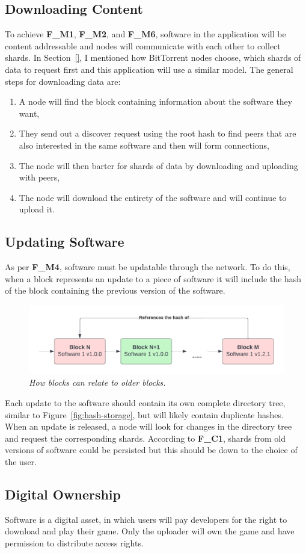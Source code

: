 \subsection*{Downloading Content}

To achieve \textbf{F\_M1}, \textbf{F\_M2}, and \textbf{F\_M6}, software in the application will be content addressable and nodes will communicate with each other to collect shards. In Section~\ref{}, I mentioned how BitTorrent nodes choose, which shards of data to request first and this application will use a similar model. The general steps for downloading data are:

\begin{enumerate}
  \item A node will find the block containing information about the software they want,
  \item They send out a discover request using the root hash to find peers that are also interested in the same software and then will form connections,
  \item The node will then barter for shards of data by downloading and uploading with peers,
  \item The node will download the entirety of the software and will continue to upload it.
\end{enumerate}

\subsection*{Updating Software}

As per \textbf{F\_M4}, software must be updatable through the network. To do this, when a block represents an update to a piece of software it will include the hash of the block containing the previous version of the software.

\begin{figure}[ht]
  \centering
  \includegraphics[width=.85\textwidth]{diagrams/update-software.png}
  \caption{\textit{How blocks can relate to older blocks.}}
\end{figure}

Each update to the software should contain its own complete directory tree, similar to Figure~\ref{fig:hash-storage}, but will likely contain duplicate hashes. When an update is released, a node will look for changes in the directory tree and request the corresponding shards. According to \textbf{F\_C1}, shards from old versions of software could be persisted but this should be down to the choice of the user.

\subsection*{Digital Ownership}

Software is a digital asset, in which users will pay developers for the right to download and play their game. Only the uploader will own the game and have permission to distribute access rights. 